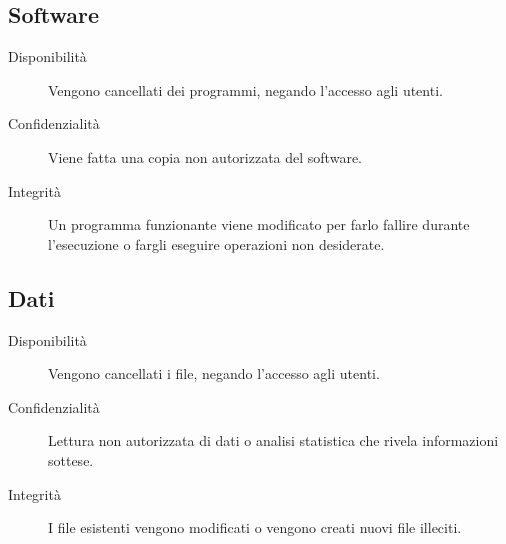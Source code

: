\subsection{Software}
\begin{description}
    \item[Disponibilità] Vengono cancellati dei programmi, negando l'accesso agli utenti.
    \item[Confidenzialità] Viene fatta una copia non autorizzata del software.
    \item[Integrità] Un programma funzionante viene modificato per farlo fallire durante l'esecuzione o fargli eseguire operazioni non desiderate.
\end{description}

\subsection{Dati}
\begin{description}
    \item[Disponibilità] Vengono cancellati i file, negando l'accesso agli utenti.
    \item[Confidenzialità] Lettura non autorizzata di dati o analisi statistica che rivela informazioni sottese.
    \item[Integrità] I file esistenti vengono modificati o vengono creati nuovi file illeciti.
\end{description}